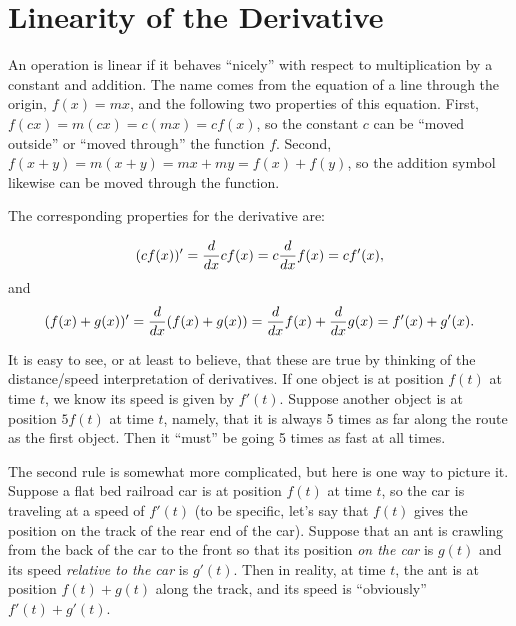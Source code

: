 \section{Linearity of the Derivative}{}{}

An operation is linear if it behaves ``nicely'' with respect to
multiplication by a constant and addition. The name comes from the
equation of a line through the origin, $f(x)=mx$, and the following two
properties of this equation. First, $f(cx)=m(cx)=c(mx)=cf(x)$, so the
constant $c$ can be ``moved outside'' or ``moved through'' the
function $f$. Second, $f(x+y)=m(x+y)=mx+my= f(x)+f(y)$, so the
addition symbol likewise can be moved through the function.

The corresponding properties for the derivative are:

$$(cf(x))' = {d\over dx}cf(x) = c {d\over dx} f(x) = cf'(x),$$
and
$$(f(x)+g(x))' = {d\over dx}(f(x)+g(x)) = {d\over dx} f(x)+{d\over dx} g(x)
=f'(x)+g'(x).$$

It is easy to see, or at least to believe,  that these are true by
thinking of the distance/speed interpretation of derivatives. If one
object is at position $f(t)$ at time $t$, we know its speed is given
by $f'(t)$. Suppose another object is at position $5f(t)$ at time $t$,
namely, that it is always 5 times as far along the route as the first
object. Then it ``must'' be going 5 times as fast at all times.

The second rule is somewhat more complicated, but here is one way to
picture it. Suppose a flat bed railroad car is at position $f(t)$ at
time $t$, so the car is traveling at a speed of $f'(t)$ (to be
specific, let's say that $f(t)$ gives the position on the track of the
rear end of the car). Suppose that an ant is crawling from the back of
the car to the front so that its position {\it on the car\/} is $g(t)$
and its speed {\it relative to the car\/} is $g'(t)$. Then in reality,
at time $t$, the ant is at position $f(t)+g(t)$ along the track, and
its speed is ``obviously'' $f'(t)+g'(t)$.

